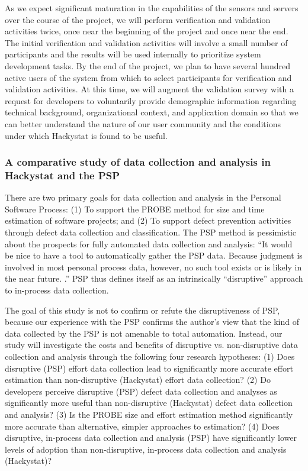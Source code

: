As we expect significant maturation in the capabilities of the sensors and
servers over the course of the project, we will perform verification and
validation activities twice, once near the beginning of the project and
once near the end.  The initial verification and validation activities will
involve a small number of participants and the results will be used
internally to prioritize system development tasks.  By the end of the
project, we plan to have several hundred active users of the system from
which to select participants for verification and validation activities.
At this time, we will augment the validation survey with a request for
developers to voluntarily provide demographic information regarding
technical background, organizational context, and application domain so
that we can better understand the nature of our user community and the
conditions under which Hackystat is found to be useful.

\subsubsection{A comparative study of data collection and 
analysis in Hackystat and the PSP}

There are two primary goals for data collection and analysis in the
Personal Software Process: (1) To support the PROBE method for size and
time estimation of software projects; and (2) To support defect prevention
activities through defect data collection and classification.  The PSP
method is pessimistic about the prospects for fully automated data 
collection and analysis: ``It would be nice to have a tool to automatically
gather the PSP data.  Because judgment is involved in most personal
process data, however, no such tool exists or is likely in the near future.
\cite{Humphrey95}.''  PSP thus defines itself as an intrinsically
``disruptive'' approach to in-process data collection. 

The goal of this study is not to confirm or refute the disruptiveness of
PSP, because our experience with the PSP confirms the author's view that
the kind of data collected by the PSP is not amenable to total automation.
Instead, our study will investigate the costs and benefits of disruptive
vs. non-disruptive data collection and analysis through the following four
research hypotheses: (1) Does disruptive (PSP) effort data collection lead
to significantly more accurate effort estimation than non-disruptive
(Hackystat) effort data collection? (2) Do developers perceive disruptive
(PSP) defect data collection and analyses as significantly more useful than
non-disruptive (Hackystat) defect data collection and analysis? (3) Is the
PROBE size and effort estimation method significantly more accurate than
alternative, simpler approaches to estimation? (4) Does disruptive,
in-process data collection and analysis (PSP) have significantly lower
levels of adoption than non-disruptive, in-process data collection and
analysis (Hackystat)?

